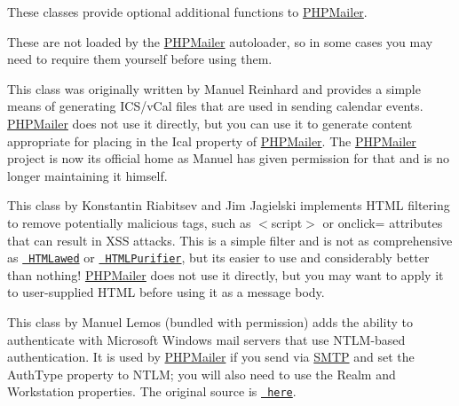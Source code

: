 These classes provide optional additional functions to \mbox{\hyperlink{classPHPMailer}{P\+H\+P\+Mailer}}.

These are not loaded by the \mbox{\hyperlink{classPHPMailer}{P\+H\+P\+Mailer}} autoloader, so in some cases you may need to {\ttfamily require} them yourself before using them.

This class was originally written by Manuel Reinhard and provides a simple means of generating I\+C\+S/v\+Cal files that are used in sending calendar events. \mbox{\hyperlink{classPHPMailer}{P\+H\+P\+Mailer}} does not use it directly, but you can use it to generate content appropriate for placing in the {\ttfamily Ical} property of \mbox{\hyperlink{classPHPMailer}{P\+H\+P\+Mailer}}. The \mbox{\hyperlink{classPHPMailer}{P\+H\+P\+Mailer}} project is now its official home as Manuel has given permission for that and is no longer maintaining it himself.

This class by Konstantin Riabitsev and Jim Jagielski implements H\+T\+ML filtering to remove potentially malicious tags, such as {\ttfamily $<$script$>$} or {\ttfamily onclick=} attributes that can result in X\+SS attacks. This is a simple filter and is not as comprehensive as \href{http://www.bioinformatics.org/phplabware/internal_utilities/htmLawed/}{\texttt{ H\+T\+M\+Lawed}} or \href{http://htmlpurifier.org}{\texttt{ H\+T\+M\+L\+Purifier}}, but it\textquotesingle{}s easier to use and considerably better than nothing! \mbox{\hyperlink{classPHPMailer}{P\+H\+P\+Mailer}} does not use it directly, but you may want to apply it to user-\/supplied H\+T\+ML before using it as a message body.

This class by Manuel Lemos (bundled with permission) adds the ability to authenticate with Microsoft Windows mail servers that use N\+T\+L\+M-\/based authentication. It is used by \mbox{\hyperlink{classPHPMailer}{P\+H\+P\+Mailer}} if you send via \mbox{\hyperlink{classSMTP}{S\+M\+TP}} and set the {\ttfamily Auth\+Type} property to {\ttfamily N\+T\+LM}; you will also need to use the {\ttfamily Realm} and {\ttfamily Workstation} properties. The original source is \href{http://www.phpclasses.org/browse/file/7495.html}{\texttt{ here}}. 